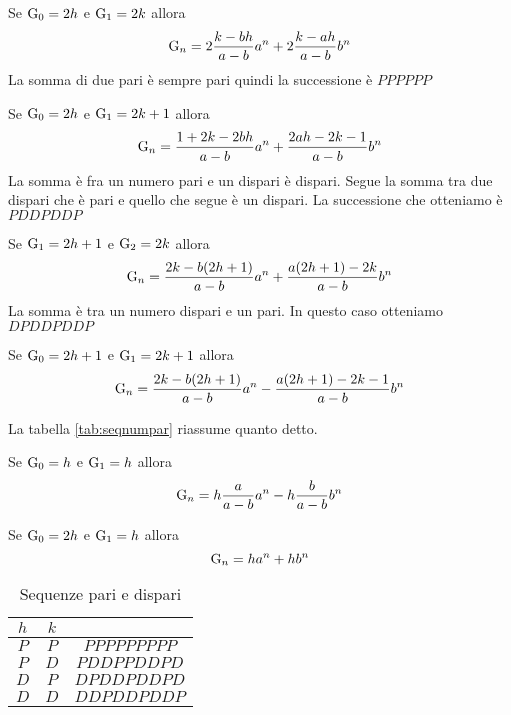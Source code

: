\begin{commento}
	Se $\mathrm{G}_{0}={}2h$ e $\mathrm{G}_{1}={}2k$ allora \begin{equation}
		\mathrm{G}_{n}={}2\dfrac{k-bh}{a-b}a^n+2\dfrac{k-ah}{a-b}b^n
	\end{equation}
La somma di due pari è sempre pari quindi la successione è $PPPPPP$
\end{commento}
\begin{commento}
	Se $\mathrm{G}_{0}={}2h$ e $\mathrm{G}_{1}={}2k+1$ allora \begin{equation}
		\mathrm{G}_{n}={}\dfrac{1+2k-2bh}{a-b}a^n+\dfrac{2ah-2k-1}{a-b }b^n
	\end{equation}
La somma è fra un numero pari e un dispari è dispari. Segue la somma tra due dispari che è pari e quello che segue è un dispari. La successione che otteniamo  è $PDDPDDP$
\end{commento}
\begin{commento}
	Se $\mathrm{G}_{1}={}2h+1$ e $\mathrm{G}_{2}={}2k$ allora \begin{equation}
		\mathrm{G}_{n}={}\dfrac{2k-b(2h+1)}{a-b}a^n+\dfrac{a(2h+1)-2k}{a-b}b^n
	\end{equation}
La somma è tra un numero dispari e un pari. In questo caso otteniamo $DPDDPDDP$
\end{commento}
\begin{commento}
	Se $\mathrm{G}_{0}={}2h+1$ e $\mathrm{G}_{1}={}2k+1$ allora \begin{equation}
		\mathrm{G}_{n}={}\dfrac{2k-b(2h+1)}{a-b}a^n-\dfrac{a(2h+1)-2k-1}{a-b}b^n
	\end{equation}
\end{commento}
La tabella \vref{tab:seqnumpar} riassume quanto detto.
\begin{commento}
	Se $\mathrm{G}_{0}={}h$ e $\mathrm{G}_{1}={}h$ allora \begin{equation}
		\mathrm{G}_{n}={}h\dfrac{a}{a-b}a^n-h\dfrac{b}{a-b}b^n
	\end{equation}
\end{commento}
\begin{commento}
	Se $\mathrm{G}_{0}={}2h$ e $\mathrm{G}_{1}={}h$ allora \begin{equation}
		\mathrm{G}_{n}={}ha^n+hb^n
	\end{equation}
\end{commento}
\begin{table}
	\centering
	\begin{tabular}{ccc}
\toprule
$h$&$k$&\\
\midrule
	$P$& $P$ &$PPPPPPPPP$ \\
	$P$& $D$ &$PDDPPDDPD$  \\
	$D$& $P$ &$DPDDPDDPD$  \\
	$D$& $D$ &$DDPDDPDDP$  \\
\bottomrule
\end{tabular}
	\caption{Sequenze pari e dispari}
	\label{tab:seqnumpar}
\end{table}
